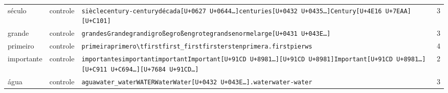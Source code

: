 \begin{tabularx}{\linewidth}{llXr}
século & controle & \texttt{\textvisiblespace{}siècle}\enspace \texttt{\textvisiblespace{}century}\enspace \texttt{-{}century}\enspace \texttt{\textvisiblespace{}década}\enspace \texttt{\textvisiblespace{}[U+0627 U+0644\ldots{}]}\enspace \texttt{\textvisiblespace{}centuries}\enspace \texttt{\textvisiblespace{}[U+0432 U+0435\ldots{}]}\enspace \texttt{\textvisiblespace{}Century}\enspace \texttt{[U+4E16 U+7EAA]}\enspace \texttt{[U+C101]} & 3 \\
grande & controle & \texttt{\textvisiblespace{}grandes}\enspace \texttt{\textvisiblespace{}Grande}\enspace \texttt{\textvisiblespace{}grandi}\enspace \texttt{\textvisiblespace{}große}\enspace \texttt{\textvisiblespace{}großen}\enspace \texttt{\textvisiblespace{}grote}\enspace \texttt{\textvisiblespace{}grands}\enspace \texttt{\textvisiblespace{}enorme}\enspace \texttt{\textvisiblespace{}large}\enspace \texttt{\textvisiblespace{}[U+0431 U+043E\ldots{}]} & 3 \\
primeiro & controle & \texttt{\textvisiblespace{}primeira}\enspace \texttt{\textvisiblespace{}primero}\enspace \texttt{\textbackslash{}tfirst}\enspace \texttt{\textvisiblespace{}first}\enspace \texttt{\_first}\enspace \texttt{first}\enspace \texttt{\textvisiblespace{}ersten}\enspace \texttt{\textvisiblespace{}primera}\enspace \texttt{.first}\enspace \texttt{\textvisiblespace{}pierws} & 4 \\
importante & controle & \texttt{\textvisiblespace{}importantes}\enspace \texttt{\textvisiblespace{}important}\enspace \texttt{important}\enspace \texttt{\textvisiblespace{}Important}\enspace \texttt{[U+91CD U+8981\ldots{}]}\enspace \texttt{[U+91CD U+8981]}\enspace \texttt{Important}\enspace \texttt{[U+91CD U+8981\ldots{}]}\enspace \texttt{\textvisiblespace{}[U+C911 U+C694\ldots{}]}\enspace \texttt{[U+7684 U+91CD\ldots{}]} & 2 \\
água & controle & \texttt{\textvisiblespace{}agua}\enspace \texttt{\textvisiblespace{}water}\enspace \texttt{\_water}\enspace \texttt{\textvisiblespace{}WATER}\enspace \texttt{Water}\enspace \texttt{\textvisiblespace{}Water}\enspace \texttt{\textvisiblespace{}[U+0432 U+043E\ldots{}]}\enspace \texttt{.water}\enspace \texttt{water}\enspace \texttt{-{}water} & 3 \\
\bottomrule
\end{tabularx}

\par{}
